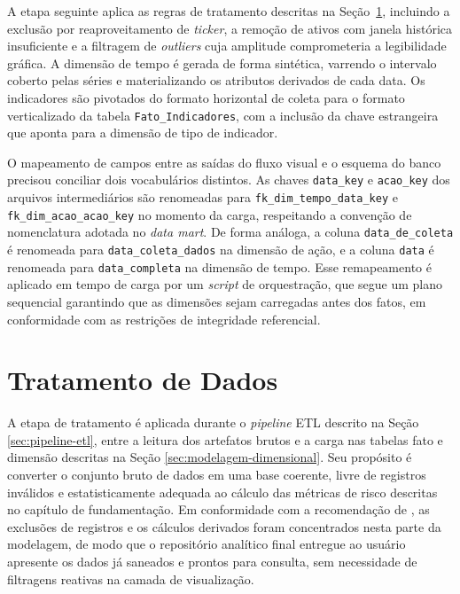 A etapa seguinte aplica as regras de tratamento descritas na Seção~\ref{sec:tratamento-dados}, incluindo a exclusão por reaproveitamento de \textit{ticker}, a remoção de ativos com janela histórica insuficiente e a filtragem de \textit{outliers} cuja amplitude comprometeria a legibilidade gráfica. A dimensão de tempo é gerada de forma sintética, varrendo o intervalo coberto pelas séries e materializando os atributos derivados de cada data. Os indicadores são pivotados do formato horizontal de coleta para o formato verticalizado da tabela \texttt{Fato\_Indicadores}, com a inclusão da chave estrangeira que aponta para a dimensão de tipo de indicador.

O mapeamento de campos entre as saídas do fluxo visual e o esquema do banco precisou conciliar dois vocabulários distintos. As chaves \texttt{data\_key} e \texttt{acao\_key} dos arquivos intermediários são renomeadas para \texttt{fk\_dim\_tempo\_data\_key} e \texttt{fk\_dim\_acao\_acao\_key} no momento da carga, respeitando a convenção de nomenclatura adotada no \textit{data mart}. De forma análoga, a coluna \texttt{data\_de\_coleta} é renomeada para \texttt{data\_coleta\_dados} na dimensão de ação, e a coluna \texttt{data} é renomeada para \texttt{data\_completa} na dimensão de tempo. Esse remapeamento é aplicado em tempo de carga por um \textit{script} de orquestração, que segue um plano sequencial garantindo que as dimensões sejam carregadas antes dos fatos, em conformidade com as restrições de integridade referencial.

\section{Tratamento de Dados}
\label{sec:tratamento-dados}

A etapa de tratamento é aplicada durante o \textit{pipeline} ETL descrito na Seção \ref{sec:pipeline-etl}, entre a leitura dos artefatos brutos e a carga nas tabelas fato e dimensão descritas na Seção \ref{sec:modelagem-dimensional}. Seu propósito é converter o conjunto bruto de dados em uma base coerente, livre de registros inválidos e estatisticamente adequada ao cálculo das métricas de risco descritas no capítulo de fundamentação. Em conformidade com a recomendação de , as exclusões de registros e os cálculos derivados foram concentrados nesta parte da modelagem, de modo que o repositório analítico final entregue ao usuário apresente os dados já saneados e prontos para consulta, sem necessidade de filtragens reativas na camada de visualização.

